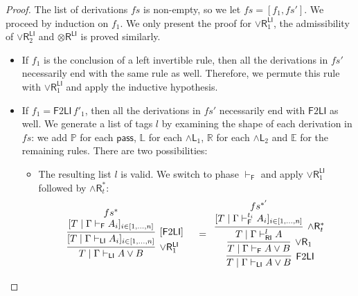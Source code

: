 \documentclass[submission,copyright,creativecommons]{eptcs}
\theoremstyle{definition}
\newcommand{\tr}{\otimes \mathsf{R}}
\newcommand{\pass}{\mathsf{pass}}
\newcommand{\andlone}{\land \mathsf{L}_{1}}
\newcommand{\andltwo}{\land \mathsf{L}_{2}}
\newcommand{\andr}{\land \mathsf{R}}
\newcommand{\orrone}{\lor \mathsf{R}_{1}}
\newcommand{\orrtwo}{\lor \mathsf{R}_{2}}
\newcommand{\RI}{\mathsf{RI}}
\newcommand{\LI}{\mathsf{LI}}
\newcommand{\F}{\mathsf{F}}
\newcommand{\tP}{\mathbb{P}}
\newcommand{\tL}{\mathbb{L}}
\newcommand{\tR}{\mathbb{R}}
\newcommand{\tE}{\mathbb{E}}
\newcommand{\proofbox}[1]{\begin{tabular}{l} #1 \end{tabular}}
\newcommand\niccolo[1]{\mbox{}
{\marginpar{\color{red}NV}}
{\sf\noindent\color{red}#1}}%
\begin{document}
\begin{proof}
  The list of derivations $fs$ is non-empty, so we let $fs = [f_1 , fs']$.
  We proceed by induction on $f_1$.
  We only present the proof for $\orrone^{\LI}$, the admissibility of $\orrtwo^{\LI}$ and $\tr^{\LI}$ is proved similarly.
  \begin{itemize}
    \item If $f_1$ is the conclusion of a left invertible rule, then all the derivations in $fs'$ necessarily end with the same rule as well.
    Therefore, we permute this rule with $\orrone^{\LI}$ and apply the inductive hypothesis.
  \item If $f_1 = \F 2 \LI \,f'_1$, then all the derivations in $fs'$ necessarily end with $\F 2 \LI$ as well. %
    We generate a list of tags $l$ by examining the shape of each derivation in $fs$: we add $\tP$ for each $\pass$, $\tL$ for each $\andlone$, $\tR$ for each $\andltwo$ and $\tE$ for the remaining rules.
    There are two possibilities:
    \begin{itemize}
      \item The resulting list $l$ is valid. We switch to phase $\vdash_\F$ and apply  $\orrone^{\LI}$ followed by $\andr^{*}_{t}$:
      \begin{displaymath}
        \begin{array}{cc}
          \proofbox{
          \infer[\orrone^{\LI}]{T \mid \Gamma \vdash_{\LI} A \lor B}{
            \infer[ {[\F 2 \LI]} ]{[T \mid \Gamma \vdash_{\LI} A_i]_{i \in [1 , \dots , n]}}{
              \deduce{[T \mid \Gamma \vdash_{\F} A_i]_{i \in [1 , \dots , n]}}{fs^{*}}
            }
          }
          }
          &
          =
          \proofbox{
          \infer[\F 2 \LI]{T \mid \Gamma \vdash_{\LI} A \lor B}{
            \infer[\orrone]{T \mid \Gamma \vdash_{\F} A \lor B}{
              \infer[\andr^{*}_t]{T \mid \Gamma \vdash^{l}_{\RI} A}{
                \deduce{[T \mid \Gamma \vdash^{t_i}_{\F} A_i]_{i \in [1 , \dots , n]}}{fs^{*'}}
              }
            }
          }
        }
        \end{array}
      \end{displaymath}

\end{itemize}
\end{itemize}
\end{proof}
\end{document}
